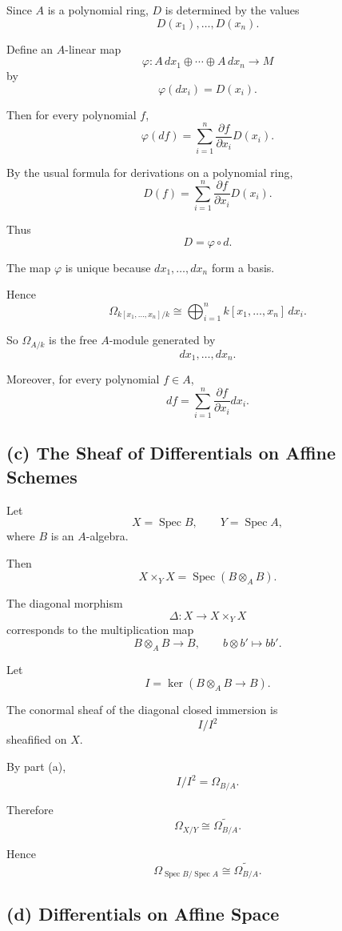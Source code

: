 Since \(A\) is a polynomial ring, \(D\) is determined by the values
\[
D(x_1),\ldots,D(x_n).
\]

Define an \(A\)-linear map
\[
\varphi:
A\,dx_1\oplus\cdots\oplus A\,dx_n
\longrightarrow M
\]
by
\[
\varphi(dx_i)=D(x_i).
\]

Then for every polynomial \(f\),
\[
\varphi(df)
=
\sum_{i=1}^n
\frac{\partial f}{\partial x_i}D(x_i).
\]

By the usual formula for derivations on a polynomial ring,
\[
D(f)
=
\sum_{i=1}^n
\frac{\partial f}{\partial x_i}D(x_i).
\]

Thus
\[
D=\varphi\circ d.
\]

The map \(\varphi\) is unique because \(dx_1,\ldots,dx_n\) form a basis.

Hence
\[
\boxed{
	\Omega_{k[x_1,\ldots,x_n]/k}
	\cong
	\bigoplus_{i=1}^n k[x_1,\ldots,x_n]\,dx_i.
}
\]

So \(\Omega_{A/k}\) is the free \(A\)-module generated by
\[
dx_1,\ldots,dx_n.
\]

Moreover, for every polynomial \(f\in A\),
\[
\boxed{
	df=\sum_{i=1}^n
	\frac{\partial f}{\partial x_i}dx_i.
}
\]

\subsection*{(c) The Sheaf of Differentials on Affine Schemes}

Let
\[
X=\operatorname{Spec}B,
\qquad
Y=\operatorname{Spec}A,
\]
where \(B\) is an \(A\)-algebra.

Then
\[
X\times_Y X
=
\operatorname{Spec}(B\otimes_A B).
\]

The diagonal morphism
\[
\Delta:X\to X\times_Y X
\]
corresponds to the multiplication map
\[
B\otimes_A B\to B,
\qquad
b\otimes b'\mapsto bb'.
\]

Let
\[
I=\ker(B\otimes_A B\to B).
\]

The conormal sheaf of the diagonal closed immersion is
\[
I/I^2
\]
sheafified on \(X\).

By part (a),
\[
I/I^2=\Omega_{B/A}.
\]

Therefore
\[
\Omega_{X/Y}
\cong
\widetilde{\Omega_{B/A}}.
\]

Hence
\[
\boxed{
	\Omega_{\operatorname{Spec}B/\operatorname{Spec}A}
	\cong
	\widetilde{\Omega_{B/A}}.
}
\]

\subsection*{(d) Differentials on Affine Space}

